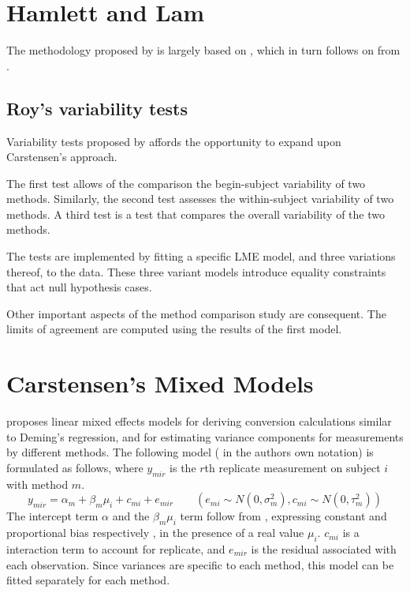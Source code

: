 \documentclass[12pt, a4paper]{report}
\theoremstyle{plain}
\theoremstyle{definition}
\theoremstyle{remark}
\begin{document}
\section{Hamlett and Lam}
The methodology proposed by \citet{Roy2009} is largely based on \citet{hamlett}, which in turn follows on from \citet{lam}.





\subsection{Roy's variability tests}
Variability tests proposed by \citet{Roy2009} affords the opportunity to expand upon Carstensen's approach.

The first test allows of the comparison the begin-subject variability of two methods. Similarly, the second test
assesses the within-subject variability of two methods. A third test is a test that compares the overall variability of the two methods.

The tests are implemented by fitting a specific LME model, and three variations thereof, to the data. These three variant models introduce equality constraints that act null hypothesis cases.

Other important aspects of the method comparison study are consequent. The limits of agreement are computed using the results of the first model.

\newpage
\section{Carstensen's Mixed Models}

\citet{BXC2004} proposes linear mixed effects models for deriving
conversion calculations similar to Deming's regression, and for
estimating variance components for measurements by different
methods. The following model ( in the authors own notation) is
formulated as follows, where $y_{mir}$ is the $r$th replicate
measurement on subject $i$ with method $m$.
\begin{equation}
y_{mir}  = \alpha_{m} + \beta_{m}\mu_{i} + c_{mi} + e_{mir} \qquad
( e_{mi} \sim N(0,\sigma^{2}_{m}), c_{mi} \sim N(0,\tau^{2}_{m}))
\end{equation}
The intercept term $\alpha$ and the $\beta_{m}\mu_{i}$ term follow
from \citet{DunnSEME}, expressing constant and proportional bias
respectively , in the presence of a real value $\mu_{i}.$
$c_{mi}$ is a interaction term to account for replicate, and
$e_{mir}$ is the residual associated with each observation.
Since variances are specific to each method, this model can be
fitted separately for each method.
\end{document}

